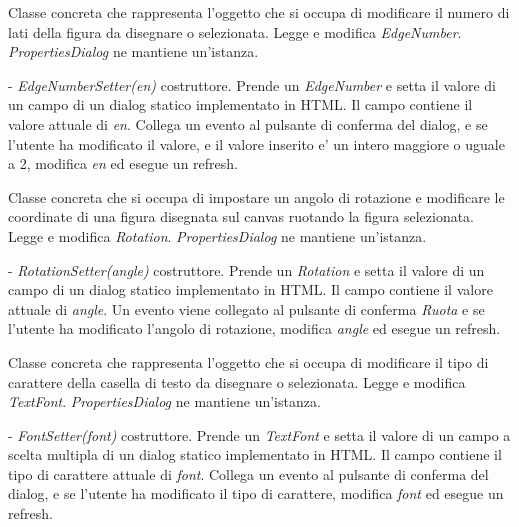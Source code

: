 Classe concreta che rappresenta l'oggetto che si occupa di modificare il numero di lati della figura da disegnare o selezionata.
Legge e modifica \textit{EdgeNumber}.
\textit{PropertiesDialog} ne mantiene un'istanza.
\begin{elencopuntato}[\subsubsecindent]
\item[-] \textit{EdgeNumberSetter(en)} costruttore. Prende un \textit{EdgeNumber} e setta il valore di un campo di un dialog statico implementato in HTML. Il campo contiene il valore attuale di \textit{en}. Collega un evento al pulsante di conferma del dialog, e se l'utente ha modificato il valore, e il valore inserito e' un intero maggiore o uguale a 2, modifica \textit{en} ed esegue un refresh.
\end{elencopuntato}

Classe concreta che si occupa di impostare un angolo di rotazione e modificare le coordinate di una figura disegnata sul canvas ruotando la figura selezionata.
Legge e modifica \textit{Rotation}.
\textit{PropertiesDialog} ne mantiene un'istanza.
\begin{elencopuntato}[\subsubsecindent]
\item[-] \textit{RotationSetter(angle)} costruttore. Prende un \textit{Rotation} e setta il valore di un campo di un dialog statico implementato in HTML. Il campo contiene il valore attuale di \textit{angle}. Un evento viene collegato al pulsante di conferma \textit{Ruota} e se l'utente ha modificato l'angolo di rotazione, modifica \textit{angle} ed esegue un refresh. 
\end{elencopuntato}

Classe concreta che rappresenta l'oggetto che si occupa di modificare il tipo di carattere della casella di testo da disegnare o selezionata.
Legge e modifica \textit{TextFont}.
\textit{PropertiesDialog} ne mantiene un'istanza.
\begin{elencopuntato}[\subsubsecindent]
\item[-] \textit{FontSetter(font)} costruttore. Prende un \textit{TextFont} e setta il valore di un campo a scelta multipla di un dialog statico implementato in HTML. Il campo contiene il tipo di carattere attuale di \textit{font}. Collega un evento al pulsante di conferma del dialog, e se l'utente ha modificato il tipo di carattere, modifica \textit{font} ed esegue un refresh.
\end{elencopuntato}

